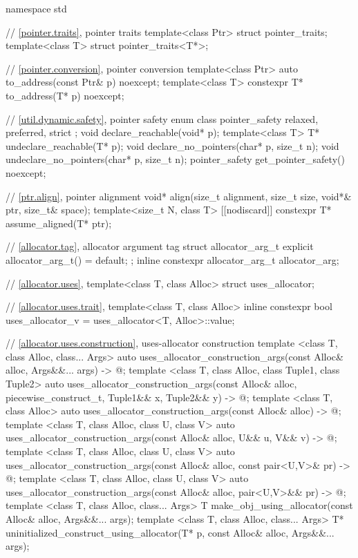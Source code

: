 %
\begin{codeblock}
namespace std {
  // \ref{pointer.traits}, pointer traits
  template<class Ptr> struct pointer_traits;
  template<class T> struct pointer_traits<T*>;

  // \ref{pointer.conversion}, pointer conversion
  template<class Ptr>
    auto to_address(const Ptr& p) noexcept;
  template<class T>
    constexpr T* to_address(T* p) noexcept;

  // \ref{util.dynamic.safety}, pointer safety
  enum class pointer_safety { relaxed, preferred, strict };
  void declare_reachable(void* p);
  template<class T>
    T* undeclare_reachable(T* p);
  void declare_no_pointers(char* p, size_t n);
  void undeclare_no_pointers(char* p, size_t n);
  pointer_safety get_pointer_safety() noexcept;

  // \ref{ptr.align}, pointer alignment
  void* align(size_t alignment, size_t size, void*& ptr, size_t& space);
  template<size_t N, class T>
    [[nodiscard]] constexpr T* assume_aligned(T* ptr);

  // \ref{allocator.tag}, allocator argument tag
  struct allocator_arg_t { explicit allocator_arg_t() = default; };
  inline constexpr allocator_arg_t allocator_arg{};

  // \ref{allocator.uses}, 
  template<class T, class Alloc> struct uses_allocator;

  // \ref{allocator.uses.trait}, 
  template<class T, class Alloc>
    inline constexpr bool uses_allocator_v = uses_allocator<T, Alloc>::value;

  // \ref{allocator.uses.construction}, uses-allocator construction
  template <class T, class Alloc, class... Args>
    auto uses_allocator_construction_args(const Alloc& alloc, Args&&... args) -> @\seebelow@;
  template <class T, class Alloc, class Tuple1, class Tuple2>
    auto uses_allocator_construction_args(const Alloc& alloc, piecewise_construct_t,
                                          Tuple1&& x, Tuple2&& y) ->  @\seebelow@;
  template <class T, class Alloc>
    auto uses_allocator_construction_args(const Alloc& alloc) -> @\seebelow@;
  template <class T, class Alloc, class U, class V>
    auto uses_allocator_construction_args(const Alloc& alloc, U&& u, V&& v) -> @\seebelow@;
  template <class T, class Alloc, class U, class V>
    auto uses_allocator_construction_args(const Alloc& alloc, const pair<U,V>& pr) -> @\seebelow@;
  template <class T, class Alloc, class U, class V>
    auto uses_allocator_construction_args(const Alloc& alloc, pair<U,V>&& pr) -> @\seebelow@;
  template <class T, class Alloc, class... Args>
    T make_obj_using_allocator(const Alloc& alloc, Args&&... args);
  template <class T, class Alloc, class... Args>
    T* uninitialized_construct_using_allocator(T* p, const Alloc& alloc, Args&&... args);

}
\end{codeblock}
